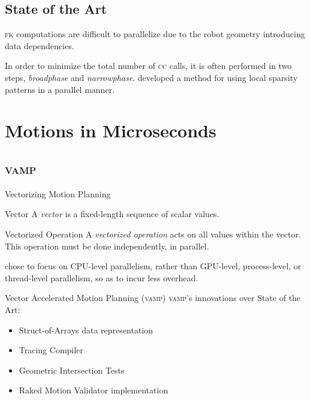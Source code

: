 \documentclass{beamer}
\begin{document}
\subsection{State of the Art}

\begin{frame}
\textsc{fk} computations are difficult to parallelize due to the robot geometry introducing data dependencies.

In order to minimize the total number of \textsc{cc} calls, it is often performed in two steps, \textit{broadphase} and \textit{narrowphase}. \cite{paper:eemp} developed a method for using local sparsity patterns in a parallel manner.
\end{frame}

\section{Motions in Microseconds}

\subsection{\textsc{vamp}}


\begin{frame}{Vectorizing Motion Planning}
\pause
\begin{block}{Vector}
A \textit{vector} is a fixed-length sequence of scalar values.
\end{block}

\begin{block}{Vectorized Operation}
A \textit{vectorized operation} acts on all values within the vector. This operation must be done independently, in parallel.
\end{block}

\pause
\cite{paper:MiM} chose to focus on CPU-level parallelism, rather than GPU-level, process-level, or thread-level parallelism, so as to incur less overhead.
\end{frame}

\begin{frame}{Vector Accelerated Motion Planning (\textsc{vamp})}
\pause
\textsc{vamp}'s innovations over State of the Art:
\begin{itemize}
\item Struct-of-Arrays data representation
\item Tracing Compiler
\item Geometric Intersection Tests
\item Raked Motion Validator implementation
\end{itemize}
\end{frame}
\end{document}
